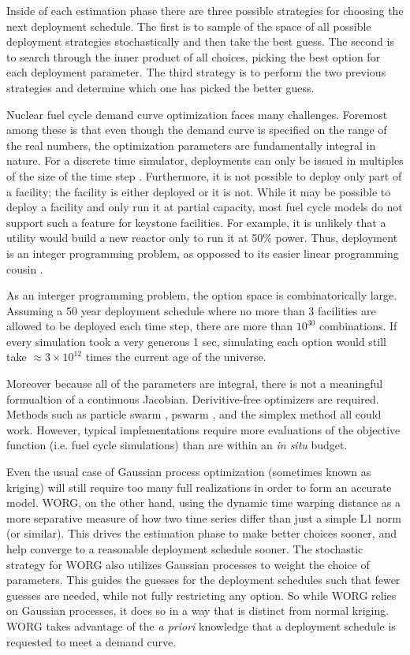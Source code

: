 Inside of each estimation phase there are three possible strategies for 
choosing the next deployment schedule.  The first is to sample of the 
space of all possible deployment strategies stochastically and then take the 
best guess.  The second is to search through the inner product of all choices,
picking the best option for each deployment parameter. The third strategy
is to perform the two previous strategies and determine which one has picked
the better guess.

Nuclear fuel cycle demand curve optimization faces many challenges. 
Foremost among these is that even though the demand curve is specified on 
the range of the real numbers, the optimization parameters are fundamentally 
integral in nature. For a discrete time simulator, deployments can only 
be issued in multiples of the size of the time step 
\cite{kelton2000simulation}. Furthermore, 
it is not possible to deploy only part of a facility; the facility is either 
deployed or it is not. While it may be possible to deploy a facility and 
only run it at partial capacity, most fuel cycle models do not support such
a feature for
keystone facilities.  For example, it is unlikely that a utility would build 
a new reactor only to run it at 50\% power. Thus, deployment is an integer 
programming problem, as oppossed to its easier linear programming cousin
\cite{vanderbei2001linear}.

As an interger programming problem, the option space is combinatorically 
large. Assuming a 50 year deployment schedule where no more than 3 facilities 
are allowed to be deployed each time step, there are more than $10^{30}$ 
combinations. If every simulation took a very generous 1 sec, simulating 
each option would still take $\approx 3\times10^{12}$ times the current age
of the universe.

Moreover because all of the parameters are integral, there is not a 
meaningful formualtion of a continuous Jacobian. Derivitive-free optimizers are 
required. Methods such as particle swarm \citeme, pswarm \citeme, and the 
simplex method all could work.  However, typical implementations require
more evaluations of the objective function (i.e. fuel cycle simulations)
than are within an \emph{in situ} budget. 

Even the usual case of 
Gaussian process optimization (sometimes known as kriging) will still 
require too many full realizations in order to form an accurate model.
WORG, on the other hand, using the dynamic time warping distance as a 
more separative measure of how two time series differ than just a simple
L1 norm (or similar). This drives the estimation phase to make better choices
sooner, and help converge to a reasonable deployment schedule sooner. 
The stochastic strategy for WORG also utilizes Gaussian processes to 
weight the choice of parameters.  This guides the guesses for the deployment
schedules such that fewer guesses are needed, while not fully restricting 
any option.  So while WORG relies on Gaussian processes, it does so in a way
that is distinct from normal kriging. WORG
takes advantage of the \emph{a priori} knowledge that a deployment 
schedule is requested to meet a demand curve. 

